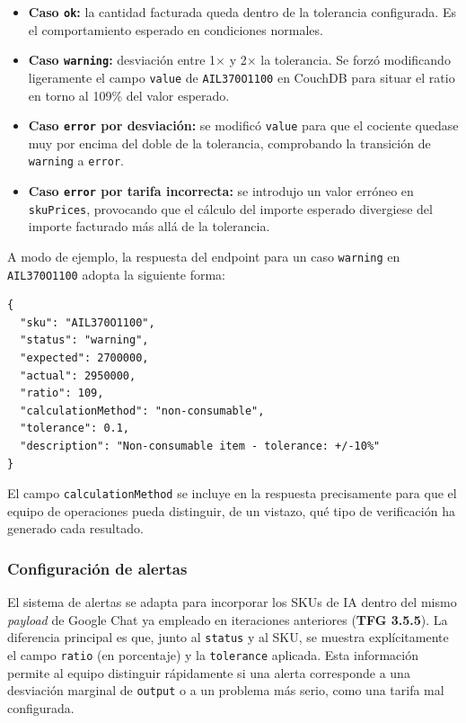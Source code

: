 \begin{itemize}
    \item \textbf{Caso \texttt{ok}:} la cantidad facturada queda dentro de la tolerancia configurada. Es el comportamiento esperado en condiciones normales.
    \item \textbf{Caso \texttt{warning}:} desviación entre 1$\times$ y 2$\times$ la tolerancia. Se forzó modificando ligeramente el campo \texttt{value} de \texttt{AIL370O1100} en CouchDB para situar el ratio en torno al 109\% del valor esperado.
    \item \textbf{Caso \texttt{error} por desviación:} se modificó \texttt{value} para que el cociente quedase muy por encima del doble de la tolerancia, comprobando la transición de \texttt{warning} a \texttt{error}.
    \item \textbf{Caso \texttt{error} por tarifa incorrecta:} se introdujo un valor erróneo en \texttt{skuPrices}, provocando que el cálculo del importe esperado divergiese del importe facturado más allá de la tolerancia.
\end{itemize}

A modo de ejemplo, la respuesta del endpoint para un caso \texttt{warning} en \texttt{AIL370O1100} adopta la siguiente forma:

\begin{lstlisting}[caption=Ejemplo de respuesta del verificador para un SKU no continuable, label=lst:resp-non-consumable]
{
  "sku": "AIL370O1100",
  "status": "warning",
  "expected": 2700000,
  "actual": 2950000,
  "ratio": 109,
  "calculationMethod": "non-consumable",
  "tolerance": 0.1,
  "description": "Non-consumable item - tolerance: +/-10%"
}
\end{lstlisting}

El campo \texttt{calculationMethod} se incluye en la respuesta precisamente para que el equipo de operaciones pueda distinguir, de un vistazo, qué tipo de verificación ha generado cada resultado.

\subsubsection{Configuración de alertas}

El sistema de alertas se adapta para incorporar los SKUs de IA dentro del mismo \textit{payload} de Google Chat ya empleado en iteraciones anteriores (\textbf{TFG 3.5.5}). La diferencia principal es que, junto al \texttt{status} y al SKU, se muestra explícitamente el campo \texttt{ratio} (en porcentaje) y la \texttt{tolerance} aplicada. Esta información permite al equipo distinguir rápidamente si una alerta corresponde a una desviación marginal de \texttt{output} o a un problema más serio, como una tarifa mal configurada.

